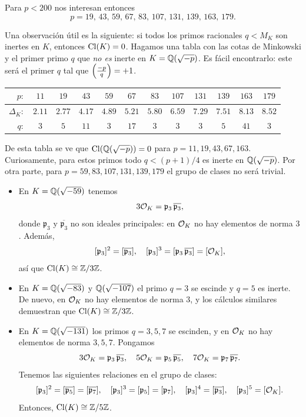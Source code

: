 \begin{ejemplo}
  Para $p < 200$ nos interesan entonces
  $$p = 19, \, 43, \, 59, \, 67, \, 83, \, 107, \, 131, \, 139, \, 163, \, 179.$$

  Una observación útil es la siguiente: si todos los primos racionales $q < M_K$
  son inertes en $K$, entonces $\operatorname{Cl} (K) = 0$. Hagamos una tabla con las cotas de
  Minkowski y el primer primo $q$ que \emph{no es} inerte en
  $K = \mathbb{Q} (\sqrt{-p})$. Es fácil encontrarlo: este será el primer $q$ tal que
  $\left(\frac{-p}{q}\right) = +1$.

  \begin{center}\renewcommand{\arraystretch}{1.5}
    \begin{tabular}{rccccccccccc}
      \hline
      $p\colon$ & $11$ & $19$ & $43$ & $59$ & $67$ & $83$ & $107$ & $131$ & $139$ & $163$ & $179$ \\
      \hline
      $\Delta_K\colon$ & $2.11$ & $2.77$ & $4.17$ & $4.89$ & $5.21$ & $5.80$ & $6.59$ & $7.29$ & $7.51$ & $8.13$ & $8.52$ \\
      \hline
      $q\colon$ & $3$ & $5$ & $11$ & $3$ & $17$ & $3$ & $3$ & $3$ & $5$ & $41$ & $3$ \\
      \hline
    \end{tabular}
  \end{center}

  De esta tabla se ve que $\operatorname{Cl} (\mathbb{Q} (\sqrt{-p})) = 0$ para
  $p = 11, 19, 43, 67, 163$. Curiosamente, para estos primos todo $q < (p+1)/4$ es
  inerte en $\mathbb{Q} (\sqrt{-p})$. Por otra parte, para
  $p = 59, 83, 107, 131, 139, 179$ el grupo de clases no será trivial.

  \begin{itemize}
  \item En $K = \mathbb{Q} (\sqrt{-59})$ tenemos
    $$3\mathcal{O}_K = \mathfrak{p}_3\,\overline{\mathfrak{p}_3},$$
    donde $\mathfrak{p}_3$ y $\overline{\mathfrak{p}_3}$ no son ideales
    principales: en $\mathcal{O}_K$ no hay elementos de norma $3$. Además,
    \[ [\mathfrak{p}_3]^2 = [\overline{\mathfrak{p}_3}], \quad
    [\mathfrak{p}_3]^3 = [\mathfrak{p}_3\,\overline{\mathfrak{p}_3}] = [\mathcal{O}_K], \]
    así que $\operatorname{Cl} (K) \cong \mathbb{Z}/3\mathbb{Z}$.

  \item En $K = \mathbb{Q} (\sqrt{-83})$ y $\mathbb{Q} (\sqrt{-107})$ el primo $q = 3$ se
    escinde y $q = 5$ es inerte. De nuevo, en $\mathcal{O}_K$ no hay elementos de norma
    $3$, y los cálculos similares demuestran que $\operatorname{Cl} (K) \cong \mathbb{Z}/3\mathbb{Z}$.

  \item En $K = \mathbb{Q} (\sqrt{-131})$ los primos $q = 3, 5, 7$ se escinden,
    y en $\mathcal{O}_K$ no hay elementos de norma $3, 5, 7$. Pongamos
    \[ 3\mathcal{O}_K = \mathfrak{p}_3 \, \overline{\mathfrak{p}_3}, \quad
    5\mathcal{O}_K = \mathfrak{p}_5 \, \overline{\mathfrak{p}_5}, \quad
    7\mathcal{O}_K = \mathfrak{p}_7 \, \overline{\mathfrak{p}_7}. \]
    Tenemos las siguientes relaciones en el grupo de clases:
    \[ [\mathfrak{p}_3]^2 = [\overline{\mathfrak{p}_5}] = [\overline{\mathfrak{p}_7}], \quad
       [\mathfrak{p}_3]^3 = [\mathfrak{p}_5] = [\mathfrak{p}_7], \quad
       [\mathfrak{p}_3]^4 = [\overline{\mathfrak{p}_3}], \quad
       [\mathfrak{p}_3]^5 = [\mathcal{O}_K]. \]
    Entonces, $\operatorname{Cl} (K) \cong \mathbb{Z}/5\mathbb{Z}$.


\end{itemize}
\end{ejemplo}
